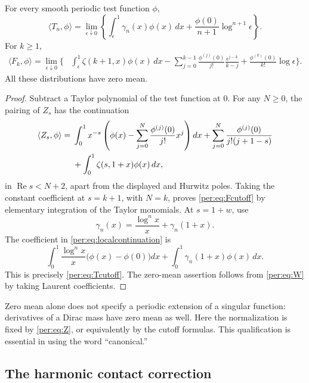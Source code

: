 \begin{proposition}
\label{per:prop:cutoffs}
For every smooth periodic test function $\phi$,
\begin{equation}\label{per:eq:Tcutoff}
 \langle T_n,\phi\rangle
 =\lim_{\epsilon\downarrow0}\left\{
   \int_\epsilon^1\gamma_n(x)\phi(x)\,dx
    +\frac{\phi(0)}{n+1}\log^{n+1}\epsilon\right\}.
\end{equation}
For $k\ge1$,
\begin{align}
 \langle F_k,\phi\rangle
 =\lim_{\epsilon\downarrow0}\biggl\{&
   \int_\epsilon^1\zeta(k+1,x)\phi(x)\,dx
   -\sum_{j=0}^{k-1}\frac{\phi^{(j)}(0)}{j!}
                       \frac{\epsilon^{j-k}}{k-j}
   +\frac{\phi^{(k)}(0)}{k!}\log\epsilon\biggr\}.
 \label{per:eq:Fcutoff}
\end{align}
All these distributions have zero mean.
\end{proposition}

\begin{proof}
Subtract a Taylor polynomial of the test function at $0$. For any
$N\ge0$, the pairing of $Z_s$ has the continuation
\begin{align}
 \langle Z_s,\phi\rangle={}&
 \int_0^1x^{-s}\left(\phi(x)-\sum_{j=0}^{N}
                         \frac{\phi^{(j)}(0)}{j!}x^j\right)dx
 +\sum_{j=0}^{N}\frac{\phi^{(j)}(0)}{j!(j+1-s)}\notag\\
 &+\int_0^1\zeta(s,1+x)\phi(x)\,dx,
 \label{per:eq:localcontinuation}
\end{align}
in $\operatorname{Re}s<N+2$, apart from the displayed and Hurwitz
poles. Taking the constant coefficient at $s=k+1$, with $N=k$,
proves \eqref{per:eq:Fcutoff} by elementary integration of the Taylor
monomials. At $s=1+w$, use
\[
 \gamma_n(x)=\frac{\log^n x}{x}+\gamma_n(1+x).
\]
The coefficient in \eqref{per:eq:localcontinuation} is
\[
 \int_0^1\frac{\log^n x}{x}\bigl(\phi(x)-\phi(0)\bigr)dx
 +\int_0^1\gamma_n(1+x)\phi(x)\,dx.
\]
This is precisely \eqref{per:eq:Tcutoff}. The zero-mean assertion
follows from \eqref{per:eq:W} by taking Laurent coefficients.
\end{proof}

Zero mean alone does not specify a periodic extension of a singular
function: derivatives of a Dirac mass have zero mean as well. Here the
normalization is fixed by \eqref{per:eq:Z}, or equivalently by the
cutoff formulas. This qualification is essential in using the word
``canonical.''

\subsection{The harmonic contact correction}

